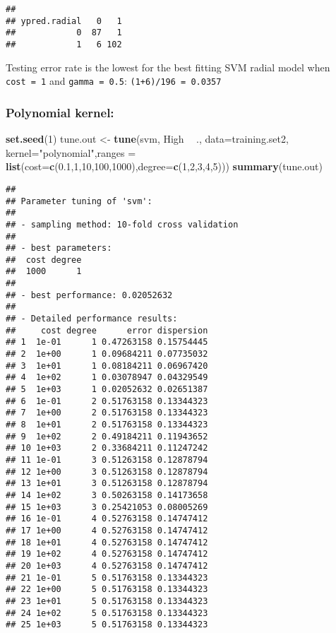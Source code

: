 \documentclass[]{article}
\newenvironment{Shaded}{\begin{snugshade}}{\end{snugshade}}
\newcommand{\KeywordTok}[1]{\textcolor[rgb]{0.13,0.29,0.53}{\textbf{#1}}}
\newcommand{\DataTypeTok}[1]{\textcolor[rgb]{0.13,0.29,0.53}{#1}}
\newcommand{\DecValTok}[1]{\textcolor[rgb]{0.00,0.00,0.81}{#1}}
\newcommand{\FloatTok}[1]{\textcolor[rgb]{0.00,0.00,0.81}{#1}}
\newcommand{\StringTok}[1]{\textcolor[rgb]{0.31,0.60,0.02}{#1}}
\newcommand{\OperatorTok}[1]{\textcolor[rgb]{0.81,0.36,0.00}{\textbf{#1}}}
\newcommand{\NormalTok}[1]{#1}
\begin{document}
\begin{verbatim}
##             
## ypred.radial   0   1
##            0  87   1
##            1   6 102
\end{verbatim}

Testing error rate is the lowest for the best fitting SVM radial model
when \texttt{cost\ =\ 1} and \texttt{gamma\ =\ 0.5}:
\texttt{(1+6)/196\ =\ 0.0357}

\subsubsection{Polynomial kernel:}\label{polynomial-kernel}

\begin{Shaded}
\begin{Highlighting}[]
\KeywordTok{set.seed}\NormalTok{(}\DecValTok{1}\NormalTok{)}
\NormalTok{tune.out <-}\StringTok{ }\KeywordTok{tune}\NormalTok{(svm, High }\OperatorTok{~}\StringTok{ }\NormalTok{., }\DataTypeTok{data=}\NormalTok{training.set2, }\DataTypeTok{kernel=}\StringTok{"polynomial"}\NormalTok{,}\DataTypeTok{ranges =} \KeywordTok{list}\NormalTok{(}\DataTypeTok{cost=}\KeywordTok{c}\NormalTok{(}\FloatTok{0.1}\NormalTok{,}\DecValTok{1}\NormalTok{,}\DecValTok{10}\NormalTok{,}\DecValTok{100}\NormalTok{,}\DecValTok{1000}\NormalTok{),}\DataTypeTok{degree=}\KeywordTok{c}\NormalTok{(}\DecValTok{1}\NormalTok{,}\DecValTok{2}\NormalTok{,}\DecValTok{3}\NormalTok{,}\DecValTok{4}\NormalTok{,}\DecValTok{5}\NormalTok{)))}
\KeywordTok{summary}\NormalTok{(tune.out)}
\end{Highlighting}
\end{Shaded}

\begin{verbatim}
## 
## Parameter tuning of 'svm':
## 
## - sampling method: 10-fold cross validation 
## 
## - best parameters:
##  cost degree
##  1000      1
## 
## - best performance: 0.02052632 
## 
## - Detailed performance results:
##     cost degree      error dispersion
## 1  1e-01      1 0.47263158 0.15754445
## 2  1e+00      1 0.09684211 0.07735032
## 3  1e+01      1 0.08184211 0.06967420
## 4  1e+02      1 0.03078947 0.04329549
## 5  1e+03      1 0.02052632 0.02651387
## 6  1e-01      2 0.51763158 0.13344323
## 7  1e+00      2 0.51763158 0.13344323
## 8  1e+01      2 0.51763158 0.13344323
## 9  1e+02      2 0.49184211 0.11943652
## 10 1e+03      2 0.33684211 0.11247242
## 11 1e-01      3 0.51263158 0.12878794
## 12 1e+00      3 0.51263158 0.12878794
## 13 1e+01      3 0.51263158 0.12878794
## 14 1e+02      3 0.50263158 0.14173658
## 15 1e+03      3 0.25421053 0.08005269
## 16 1e-01      4 0.52763158 0.14747412
## 17 1e+00      4 0.52763158 0.14747412
## 18 1e+01      4 0.52763158 0.14747412
## 19 1e+02      4 0.52763158 0.14747412
## 20 1e+03      4 0.52763158 0.14747412
## 21 1e-01      5 0.51763158 0.13344323
## 22 1e+00      5 0.51763158 0.13344323
## 23 1e+01      5 0.51763158 0.13344323
## 24 1e+02      5 0.51763158 0.13344323
## 25 1e+03      5 0.51763158 0.13344323
\end{verbatim}
\end{document}
